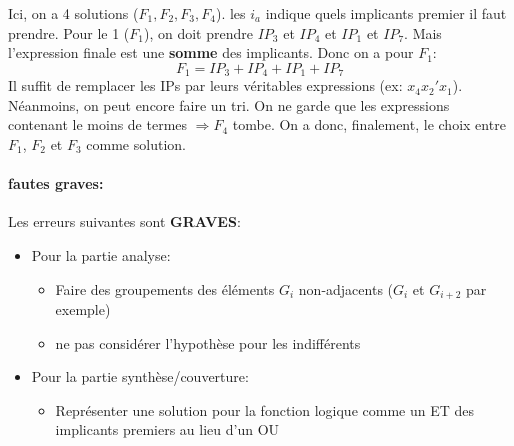 Ici, on a 4 solutions ($F_1,F_2,F_3,F_4$). les $i_a$ indique quels implicants premier il faut prendre. Pour le 1 ($F_1$), on doit prendre $IP_3$ et $IP_4$ et $IP_1$ et $IP_7$. Mais l'expression finale est une \textbf{somme} des implicants. Donc on a pour $F_1$:
\begin{equation}
	F_1=IP_3+IP_4+IP_1+IP_7
\end{equation}
Il suffit de remplacer les IPs par leurs véritables expressions (ex: $x_4x_2'x_1$).\\

Néanmoins, on peut encore faire un tri. On ne garde que les expressions contenant le moins de termes $\Rightarrow F_4$ tombe. On a donc, finalement, le choix entre $F_1$, $F_2$ et $F_3$ comme solution. 
\paragraph{fautes graves:}
Les erreurs suivantes sont \textbf{GRAVES}:
\begin{itemize}
	\item Pour la partie analyse:
	\begin{itemize}
		\item Faire des groupements des éléments $G_i$ non-adjacents ($G_i$ et $G_{i+2}$ par exemple)
		\item ne pas considérer l'hypothèse pour les indifférents
	\end{itemize}
	\item Pour la partie synthèse/couverture:
	\begin{itemize}
		\item Représenter une solution pour la fonction logique comme un ET des implicants premiers au lieu d'un OU
	\end{itemize}
\end{itemize}